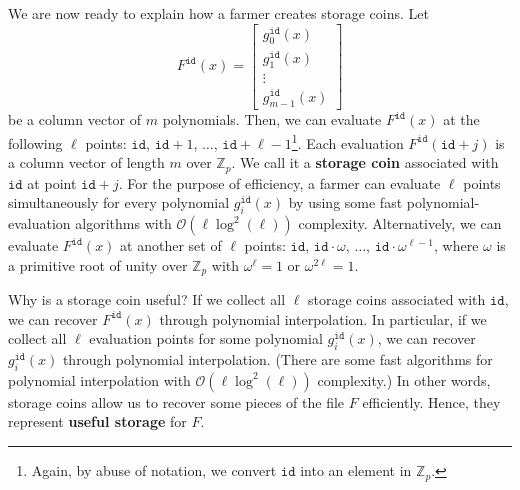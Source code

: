 \documentclass[12pt,draftcls,onecolumn]{IEEEtran}
\newcommand{\Fp}{\mathbb{Z}_p}
\newcommand{\id}{\texttt{id}}
\begin{document}
We are now ready to explain how a farmer creates storage coins. Let
\[
F^{\id}(x) = \begin{bmatrix} g_0^{\id}(x)\\ g_1^{\id}(x)\\  \vdots \\ g_{m-1}^{\id}(x) \end{bmatrix}
\]
be a column vector of $m$ polynomials. 
Then, we can evaluate $F^{\id}(x)$ at the following $\ell$ points: $\id$, $\id + 1$, $\ldots$, $\id + \ell - 1$\footnote{Again, by abuse of notation, we convert $\id$ into an element in $\Fp$.}.
Each evaluation $F^{\id}(\id + j)$ is a column vector of length $m$ over $\Fp$. We  call it a {\bf storage coin}
associated with $\id$ at point $\id + j$.
For the purpose of efficiency, a farmer can evaluate $\ell$ points simultaneously for every polynomial $g_i^{\id}(x)$
by using some fast polynomial-evaluation algorithms with $\mathcal{O}(\ell \log^2(\ell))$ complexity.
Alternatively, we can evaluate $F^{\id}(x)$ at another set of $\ell$ points: $\id$, $\id \cdot \omega$, $\ldots$, $\id \cdot \omega^{\ell - 1}$, where $\omega$ is a primitive root of unity over $\Fp$ with $\omega^\ell = 1$ or $\omega^{2 \ell} = 1$.


Why is a storage coin useful? If we collect all $\ell$ storage coins associated with $\id$, we can recover $F^{\id}(x)$ through polynomial interpolation.
In particular, if we collect all $\ell$ evaluation points for some polynomial $g_i^{\id}(x)$, we can recover $g_i^{\id}(x)$ through polynomial interpolation.
(There are some fast algorithms for polynomial interpolation with $\mathcal{O}(\ell \log^2(\ell))$ complexity.)
In other words, storage coins allow us to recover some pieces of the file $F$ efficiently. Hence, they represent {\bf useful storage} for $F$.
\end{document}
